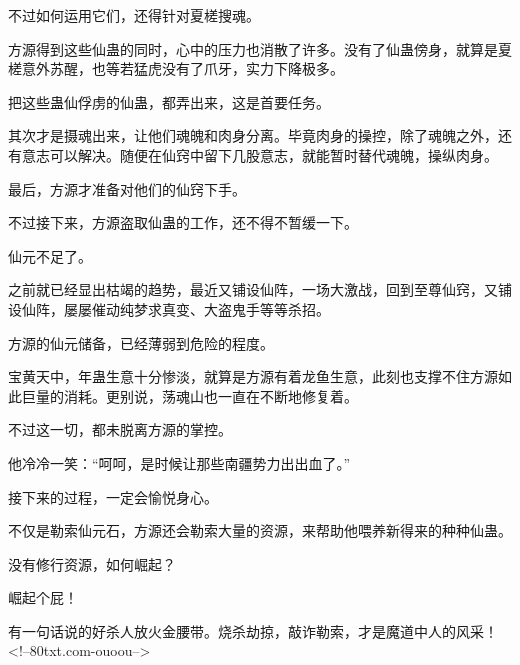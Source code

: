 \begin{this_body}
不过如何运用它们，还得针对夏槎搜魂。

方源得到这些仙蛊的同时，心中的压力也消散了许多。没有了仙蛊傍身，就算是夏槎意外苏醒，也等若猛虎没有了爪牙，实力下降极多。

把这些蛊仙俘虏的仙蛊，都弄出来，这是首要任务。

其次才是摄魂出来，让他们魂魄和肉身分离。毕竟肉身的操控，除了魂魄之外，还有意志可以解决。随便在仙窍中留下几股意志，就能暂时替代魂魄，操纵肉身。

最后，方源才准备对他们的仙窍下手。

不过接下来，方源盗取仙蛊的工作，还不得不暂缓一下。

仙元不足了。

之前就已经显出枯竭的趋势，最近又铺设仙阵，一场大激战，回到至尊仙窍，又铺设仙阵，屡屡催动纯梦求真变、大盗鬼手等等杀招。

方源的仙元储备，已经薄弱到危险的程度。

宝黄天中，年蛊生意十分惨淡，就算是方源有着龙鱼生意，此刻也支撑不住方源如此巨量的消耗。更别说，荡魂山也一直在不断地修复着。

不过这一切，都未脱离方源的掌控。

他冷冷一笑：“呵呵，是时候让那些南疆势力出出血了。”

接下来的过程，一定会愉悦身心。

不仅是勒索仙元石，方源还会勒索大量的资源，来帮助他喂养新得来的种种仙蛊。

没有修行资源，如何崛起？

崛起个屁！

有一句话说的好杀人放火金腰带。烧杀劫掠，敲诈勒索，才是魔道中人的风采！<!--80txt.com-ouoou-->

\end{this_body}

